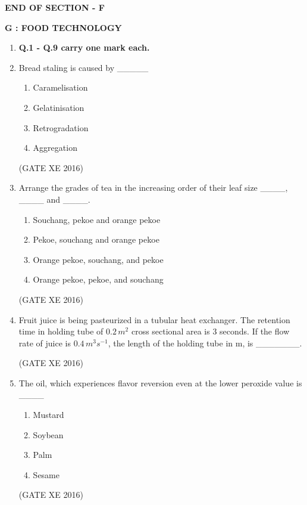 \documentclass[12pt]{article}
\begin{document}
\begin{center}
    \textbf{END OF SECTION - F}
\end{center}

\newpage

\begin{center}
    {\Large \textbf{G : FOOD TECHNOLOGY}}
\end{center}

\begin{enumerate}

\item[] \textbf{Q.1 - Q.9 carry one mark each.}

\item Bread staling is caused by \_\_\_\_\_
\begin{multicols}{4}
\begin{enumerate}
\item Caramelisation
\item Gelatinisation
\item Retrogradation
\item Aggregation
\end{enumerate}
\end{multicols}
(GATE XE 2016)

\item Arrange the grades of tea in the increasing order of their leaf size \_\_\_\_, \_\_\_\_ and \_\_\_\_.
\begin{enumerate}
\item Souchang, pekoe and orange pekoe
\item Pekoe, souchang and orange pekoe
\item Orange pekoe, souchang, and pekoe
\item Orange pekoe, pekoe, and souchang
\end{enumerate}
(GATE XE 2016)

\item Fruit juice is being pasteurized in a tubular heat exchanger. The retention time in holding tube of $0.2 \, m^2$ cross sectional area is $3$ seconds. If the flow rate of juice is $0.4 \, m^3 s^{-1}$, the length of the holding tube in m, is \_\_\_\_\_\_\_.

(GATE XE 2016)

\item The oil, which experiences flavor reversion even at the lower peroxide value is \_\_\_\_
\begin{multicols}{2}
\begin{enumerate}
\item Mustard
\item Soybean
\item Palm
\item Sesame
\end{enumerate}
\end{multicols}
(GATE XE 2016)


\end{enumerate}
\end{document}
